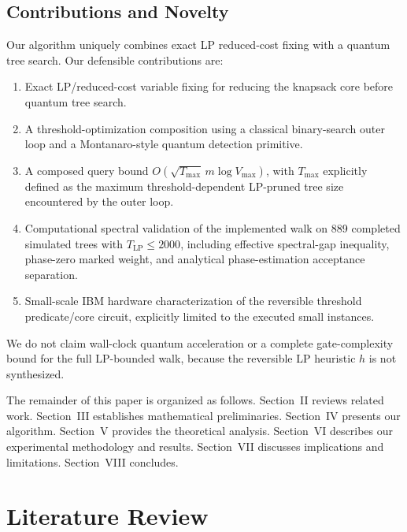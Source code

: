 \documentclass[conference]{IEEEtran} \IEEEoverridecommandlockouts
\begin{document}
\subsection{Contributions and Novelty}

Our algorithm uniquely combines exact LP reduced-cost fixing with a quantum tree search. Our defensible contributions are:

\begin{enumerate}
    \item Exact LP/reduced-cost variable fixing for reducing the knapsack core before quantum tree search.
    \item A threshold-optimization composition using a classical binary-search outer loop and a Montanaro-style quantum detection primitive.
    \item A composed query bound $O\!\left(\sqrt{T_{\max}}\,m\log V_{\max}\right)$, with $T_{\max}$ explicitly defined as the maximum threshold-dependent LP-pruned tree size encountered by the outer loop.
    \item Computational spectral validation of the implemented walk on 889 completed simulated trees with $T_{\text{LP}} \le 2000$, including effective spectral-gap inequality, phase-zero marked weight, and analytical phase-estimation acceptance separation.
    \item Small-scale IBM hardware characterization of the reversible threshold predicate/core circuit, explicitly limited to the executed small instances.
\end{enumerate}

We do not claim wall-clock quantum acceleration or a complete gate-complexity bound for the full LP-bounded walk, because the reversible LP heuristic $h$ is not synthesized.

The remainder of this paper is organized as follows. Section~II reviews related work. Section~III establishes mathematical preliminaries. Section~IV presents our algorithm. Section~V provides the theoretical analysis. Section~VI describes our experimental methodology and results. Section~VII discusses implications and limitations. Section~VIII concludes.

\section{Literature Review}
\end{document}
